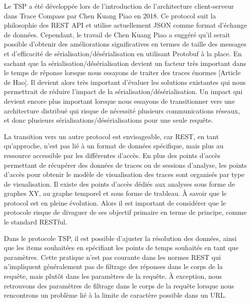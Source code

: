 Le TSP a été développée lors de l'introduction de l'architecture client-serveur dans Trace Compass par Chen Kuang Piao en 2018. Ce protocol suit la philosophie des REST API et utilise actuellement JSON comme format d'échange de données. Cependant, le travail de Chen Kuang Piao a suggéré qu'il serait possible d'obtenir des améliorations significatives en termes de taille des messages et d'efficacité de sérialisation/désérialisation en utilisant Protobuf à la place. En sachant que la sérialisation/désérialisation devient un facteur très important dans le temps de réponse lorsque nous essayons de traiter des traces énormes [Article de Hao]. Il devient alors très important d'évaluer les solutions existantes qui nous permettrait de réduire l'impact de la sérialisation/désérialisation. Un impact qui devient encore plus important lorsque nous essayons de transitionner vers une architecture distribué qui risque de nécessité plusieurs communications réseaux, et donc plusieurs sérialisations/désérialisations pour une seule requête. 

La transition vers un autre protocol est envisageable, car REST, en tant qu'approche, n'est pas lié à un format de données spécifique, mais plus au ressource accessible par les différentes d'accès. En plus des points d'accès permettant de récupérer des données de traces ou de sessions d'analyse, les points d'accès pour obtenir le modèle de visualisation des traces sont organisés par type de visualisation. Il existe des points d'accès dédiés aux analyses sous forme de graphes XY, au graphe temporel et sous forme de trableau. À savoir que le protocol est en pleine évolution. Alors il est important de considérer que le protocole risque de divaguer de ses objectif primaire en terme de principe, comme le standard RESTful. 

Dans le protocole TSP, il est possible d'ajuster la résolution des données, ainsi que les items souhaitées en spécifiant les points de temps souhaités en tant que paramètres. Cette pratique n'est pas courante dans les normes REST qui n'impliquent généralement pas de filtrage des réponses dans le corps de la requête, mais plutôt dans les paramètres de la requête. À exception, nous retrouvons des paramètres de filtrage dans le corps de la requête lorsque nous rencontrons un problème lié à la limite de caractère possible dans un URL.





